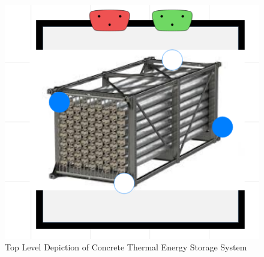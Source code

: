 \begin{figure}[hbtp]
\centering
\includegraphics[scale=0.8]{pics/CTES.png}
\caption{Top Level Depiction of Concrete Thermal Energy Storage System}
\label{CTES}
\end{figure}

%
